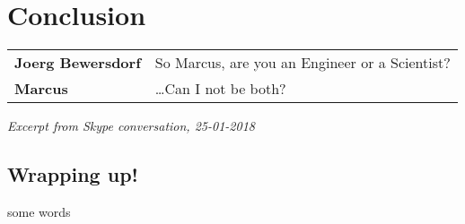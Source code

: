 \chapter{Conclusion}
\label{chap:conclusion}


\ifpdf
    \graphicspath{{Chapter6/Figs/Raster/}{Chapter6/Figs/PDF/}{Chapter6/Figs/}}
\else
    \graphicspath{{Chapter6/Figs/Vector/}{Chapter6/Figs/}}
\fi

\begin{tabular}{l l}
\textbf{Joerg Bewersdorf} & So Marcus, are you an Engineer or a Scientist? \\
\textbf{Marcus} & \ldots Can I not be both? 
\end{tabular}

\textit{Excerpt from Skype conversation, 25-01-2018}

\section{Wrapping up!}
some words
